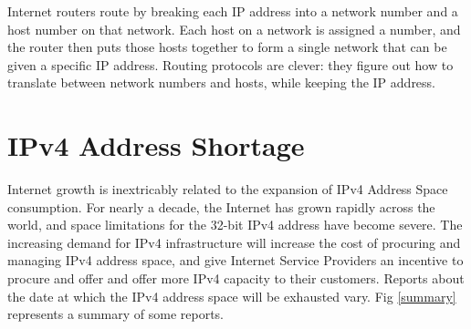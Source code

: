 \documentclass[conference]{IEEEtran}
\begin{document}
Internet routers route by breaking each IP address into a network number and a host number on that network. Each host on a network is assigned a number, and the router then puts those hosts together to form a single network that can be given a specific IP address. Routing protocols are clever: they figure out how to translate between network numbers and hosts, while keeping the IP address.

\section{IPv4 Address Shortage}
Internet growth is inextricably related to the expansion of IPv4 Address Space consumption. For nearly a decade, the Internet has grown rapidly across the world, and space limitations for the 32-bit IPv4 address have become severe. The increasing demand for IPv4 infrastructure will increase the cost of procuring and managing IPv4 address space, and give Internet Service Providers an incentive to procure and offer and offer more IPv4 capacity to their customers. Reports about the date at which the IPv4 address space will be exhausted vary. Fig \ref{summary} represents a summary of some reports.
\end{document}
